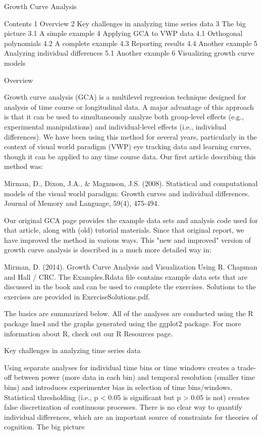 Growth Curve Analysis

Contents
1 Overview
2 Key challenges in analyzing time series data
3 The big picture
3.1 A simple example
4 Applying GCA to VWP data
4.1 Orthogonal polynomials
4.2 A complete example
4.3 Reporting results
4.4 Another example
5 Analyzing individual differences
5.1 Another example
6 Visualizing growth curve models

Overview

Growth curve analysis (GCA) is a multilevel regression technique designed for analysis of time course or longitudinal data. A major advantage of this approach is that it can be used to simultaneously analyze both group-level effects (e.g., experimental manipulations) and individual-level effects (i.e., individual differences). We have been using this method for several years, particularly in the context of visual world paradigm (VWP) eye tracking data and learning curves, though it can be applied to any time course data. Our first article describing this method was:

Mirman, D., Dixon, J.A., & Magnuson, J.S. (2008). Statistical and computational models of the visual world paradigm: Growth curves and individual differences. Journal of Memory and Language, 59(4), 475-494.

Our original GCA page provides the example data sets and analysis code used for that article, along with (old) tutorial materials. Since that original report, we have improved the method in various ways. This "new and improved" version of growth curve analysis is described in a much more detailed way in:

Mirman, D. (2014). Growth Curve Analysis and Visualization Using R. Chapman and Hall / CRC.
    The Examples.Rdata file contains example data sets that are discussed in the book and can be used to complete the exercises. 
    Solutions to the exercises are provided in ExerciseSolutions.pdf.

The basics are summarized below. All of the analyses are conducted using the R package lme4 and the graphs generated using the ggplot2 package. For more information about R, check out our R Resources page.

Key challenges in analyzing time series data

Using separate analyses for individual time bins or time windows creates a trade-off between power (more data in each bin) and temporal resolution (smaller time bins) and introduces experimenter bias in selection of time bins/windows.
Statistical thresholding (i.e., p < 0.05 is significant but p > 0.05 is not) creates false discretization of continuous processes.
There is no clear way to quantify individual differences, which are an important source of constraints for theories of cognition.
The big picture


